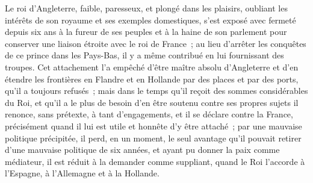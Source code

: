 \documentclass[french,twoside]{book} %
\begin{document}
Le roi d’Angleterre, faible, paresseux, et plongé dans les plaisirs, oubliant les intérêts de son royaume et ses exemples domestiques, s’est exposé avec fermeté depuis six ans à la fureur de ses peuples et à la haine de son parlement pour conserver une liaison étroite avec le roi de France ; au lieu d’arrêter les conquêtes de ce prince dans les Pays-Bas, il y a même contribué en lui fournissant des troupes. Cet attachement l’a empêché d’être maître absolu d’Angleterre et d’en étendre les frontières en Flandre et en Hollande par des places et par des ports, qu’il a toujours refusés ; mais dans le temps qu’il reçoit des sommes considérables du Roi, et qu’il a le plus de besoin d’en être soutenu contre ses propres sujets il renonce, sans prétexte, à tant d’engagements, et il se déclare contre la France, précisément quand il lui est utile et honnête d’y être attaché ; par une mauvaise politique précipitée, il perd, en un moment, le seul avantage qu’il pouvait retirer d’une mauvaise politique de six années, et ayant pu donner la paix comme médiateur, il est réduit à la demander comme suppliant, quand le Roi l’accorde à l’Espagne, à l’Allemagne et à la Hollande.\par
\end{document}
